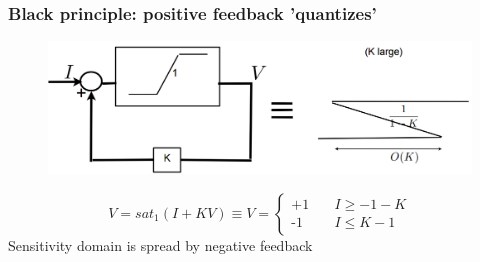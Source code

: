 \documentclass{beamer}
\begin{document}
\begin{frame}
\frametitle{Black principle: positive feedback 'quantizes'}
\begin{figure}
\includegraphics[width=1\linewidth]{black_positive}
\end{figure}
\[   
V =  sat_{1}(I + KV) \equiv V =
     \begin{cases}
       \mbox{+1} &\quad \text{$I \geq -1-K$}\\
       \mbox{-1} &\quad \text{$I \leq K-1$}\
     \end{cases}
\]
Sensitivity domain is spread by negative feedback\\
$\;$
\end{frame}

\end{document}
